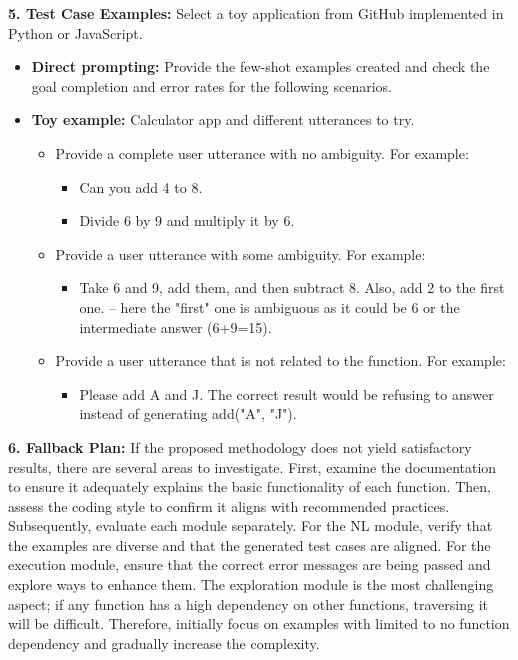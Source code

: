 \begin{tcolorbox}[colback=blue!5!white,colframe=blue!75!black,title=\textbf{Autoprompting: Generate Diverse Few-Shot Examples for Any Application (Part 2)}]
{\textbf{5. Test Case Examples:} Select a toy application from GitHub implemented in Python or JavaScript.
\begin{itemize}
    \item \textbf{Direct prompting:} Provide the few-shot examples created and check the goal completion and error rates for the following scenarios.
    \item \textbf{Toy example:} Calculator app and different utterances to try.
    \begin{itemize}
        \item Provide a complete user utterance with no ambiguity. For example:
        \begin{itemize}
            \item Can you add 4 to 8.
            \item Divide 6 by 9 and multiply it by 6.
        \end{itemize}
        \item Provide a user utterance with some ambiguity. For example:
        \begin{itemize}
            \item Take 6 and 9, add them, and then subtract 8. Also, add 2 to the first one. – here the "first" one is ambiguous as it could be 6 or the intermediate answer (6+9=15).
        \end{itemize}
        \item Provide a user utterance that is not related to the function. For example:
        \begin{itemize}
            \item Please add A and J. The correct result would be refusing to answer instead of generating add("A", "J").
        \end{itemize}
    \end{itemize}
\end{itemize}

\textbf{6. Fallback Plan:} If the proposed methodology does not yield satisfactory results, there are several areas to investigate. First, examine the documentation to ensure it adequately explains the basic functionality of each function. Then, assess the coding style to confirm it aligns with recommended practices. Subsequently, evaluate each module separately. For the NL module, verify that the examples are diverse and that the generated test cases are aligned. For the execution module, ensure that the correct error messages are being passed and explore ways to enhance them. The exploration module is the most challenging aspect; if any function has a high dependency on other functions, traversing it will be difficult. Therefore, initially focus on examples with limited to no function dependency and gradually increase the complexity.
}
\end{tcolorbox}

